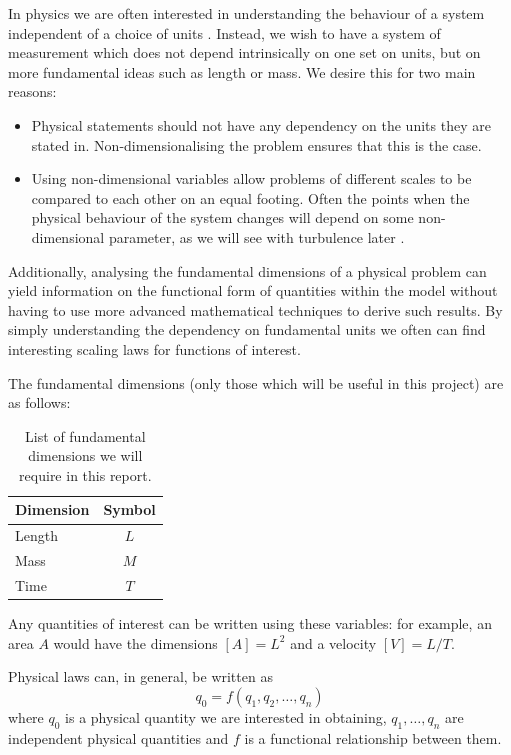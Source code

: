 In physics we are often interested in understanding the behaviour of a system independent of a
choice of units \citet{0143-0807-31-4-019}. Instead, we wish to
have a system of measurement which does not depend intrinsically on one set on units, but on more 
fundamental ideas such as length or mass. We desire this for two main reasons:
\begin{itemize}
	\item Physical statements should not have any dependency on the units they are stated in.
	Non-dimensionalising the problem ensures that this is the case.
	\item Using non-dimensional variables allow problems of different scales to be compared to each 
	other on an equal footing. Often the points when the physical behaviour of the system changes 
	will depend on some non-dimensional parameter, as we will see with turbulence later \citet{jensen2013introducing}.
\end{itemize}

Additionally, analysing the fundamental dimensions of a physical problem can yield information on the
functional form of quantities within the model without having to use more advanced mathematical
techniques to derive such results. By simply understanding the dependency on fundamental units we
often can find interesting scaling laws for functions of interest.

The fundamental dimensions (only those which will be useful in this project) are as follows:
\begin{table}[h]
\centering
\begin{tabular}{l c}
Dimension & Symbol \\
\hline
Length & $L$ \\
Mass & $M$ \\
Time & $T$
\end{tabular}
\caption[List of fundamental dimensions]{List of fundamental dimensions we will require in this report.}
\end{table}

Any quantities of interest can be written using these variables: for example, an area $A$ would have 
the dimensions $[A] = L^2$ and a velocity $[V] = L/T$.

Physical laws can, in general, be written as \citet{0143-0807-31-4-019}
\begin{equation} \label{functional}
q_{0} = f(q_1,q_2,\ldots,q_n)
\end{equation}
where $q_0$ is a physical quantity we are interested in obtaining, $q_1,\ldots,q_n$ are independent
physical quantities and $f$ is a functional relationship between them.

